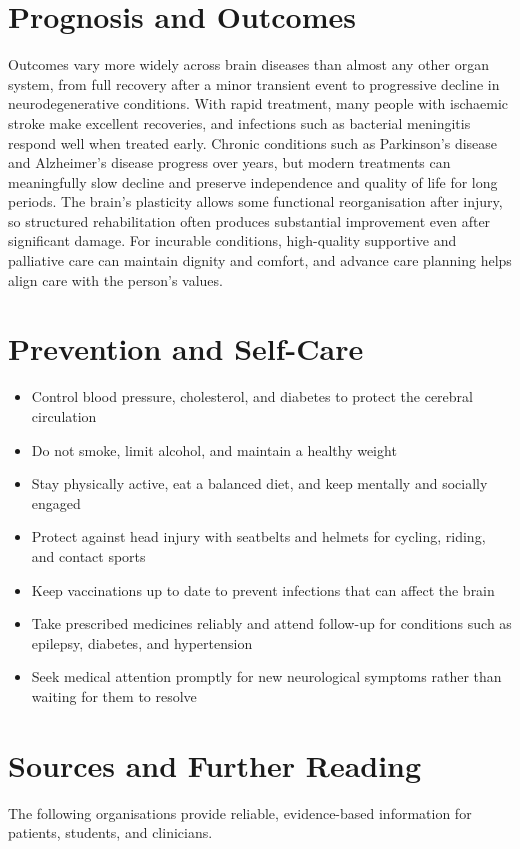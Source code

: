 \section*{Prognosis and Outcomes}
Outcomes vary more widely across brain diseases than almost any other organ system, from full recovery after a minor transient event to progressive decline in neurodegenerative conditions. With rapid treatment, many people with ischaemic stroke make excellent recoveries, and infections such as bacterial meningitis respond well when treated early. Chronic conditions such as Parkinson's disease and Alzheimer's disease progress over years, but modern treatments can meaningfully slow decline and preserve independence and quality of life for long periods. The brain's plasticity allows some functional reorganisation after injury, so structured rehabilitation often produces substantial improvement even after significant damage. For incurable conditions, high-quality supportive and palliative care can maintain dignity and comfort, and advance care planning helps align care with the person's values.

\section*{Prevention and Self-Care}
\begin{itemize}
    \item Control blood pressure, cholesterol, and diabetes to protect the cerebral circulation
    \item Do not smoke, limit alcohol, and maintain a healthy weight
    \item Stay physically active, eat a balanced diet, and keep mentally and socially engaged
    \item Protect against head injury with seatbelts and helmets for cycling, riding, and contact sports
    \item Keep vaccinations up to date to prevent infections that can affect the brain
    \item Take prescribed medicines reliably and attend follow-up for conditions such as epilepsy, diabetes, and hypertension
    \item Seek medical attention promptly for new neurological symptoms rather than waiting for them to resolve
\end{itemize}

\section*{Sources and Further Reading}
The following organisations provide reliable, evidence-based information for patients, students, and clinicians.

